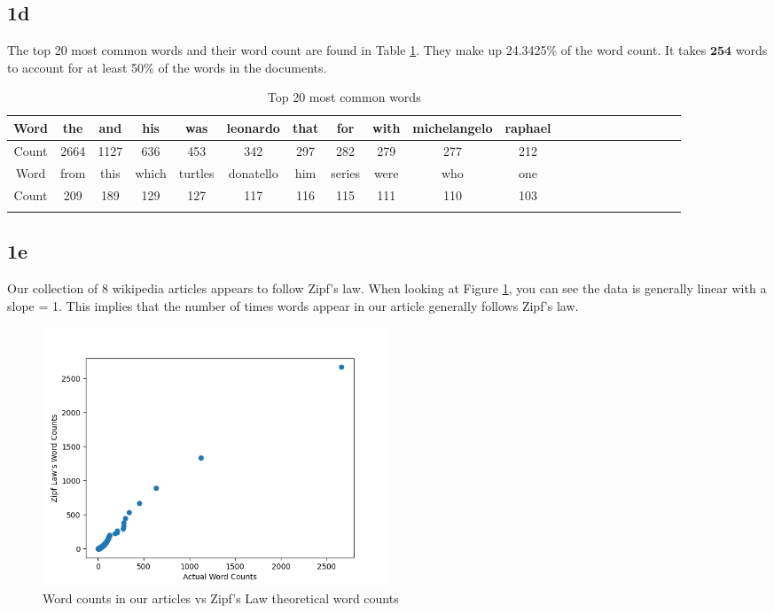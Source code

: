 \documentclass[12pt]{article}
\begin{document}
\subsection*{1d}

The top 20 most common words and their word count are found in Table \ref{word_count}. They make up 24.3425\% of the word count. It takes $\mathbf{254}$ words to account for at least 50\% of the words in the documents.

\begin{table}[h!]
    \centering
    \caption{Top 20 most common words}
    \vspace*{4mm}
    \label{word_count}
    \begin{tabular}{c|cccccccccccccccccccc}
        \Xhline{3\arrayrulewidth}
        Word & the & and & his & was & leonardo & that & for & with & michelangelo & raphael\\\hline
        Count & 2664 & 1127 & 636 & 453 & 342 & 297 & 282 & 279 & 277 & 212 \\
        \Xhline{3\arrayrulewidth}
        Word &  from & this & which & turtles & donatello & him & series & were & who & one \\\hline
        Count & 209 & 189 & 129 & 127 & 117 & 116 & 115 & 111 & 110 & 103 \\
        \Xhline{3\arrayrulewidth}
    \end{tabular}
\end{table}

\subsection*{1e}

Our collection of 8 wikipedia articles appears to follow Zipf's law. When looking at Figure \ref{fig:zipf}, you can see the data is generally linear with a slope = 1. This implies that the number of times words appear in our article generally follows Zipf's law.

\begin{figure}
    \centering
    \includegraphics[width=0.5\textwidth]{../plots/zipf_law.png}
    \caption{Word counts in our articles vs Zipf's Law theoretical word counts}
    \label{fig:zipf}
\end{figure}
\end{document}
